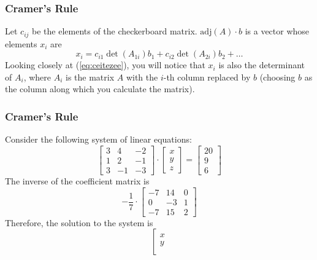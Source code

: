 \documentclass[xcolor=dvipsnames]{beamer}
\begin{document}
\begin{frame}
  \frametitle{Cramer's Rule}
Let $c_{ij}$ be the elements of the checkerboard matrix.
$\mbox{adj}(A)\cdot{}b$ is a vector whose elements $x_{i}$ are
\begin{equation}
  \label{eq:ceitezee}
  x_{i}=c_{i1}\det(A_{1i})b_{1}+c_{i2}\det(A_{2i})b_{2}+{\ldots}
\end{equation}
Looking closely at (\ref{eq:ceitezee}), you will notice that $x_{i}$
is also the determinant of $A_{i}$, where $A_{i}$ is the matrix $A$
with the $i$-th column replaced by $b$ (choosing $b$ as the column
along which you calculate the matrix).
\end{frame}

\begin{frame}
  \frametitle{Cramer's Rule}
  Consider the following system of linear
  equations:
  \begin{equation}
    \label{eq:keiyikae}
    \left[
      \begin{array}{ccc}
        3 & 4 & -2 \\
        1 & 2 & -1 \\
        3 & -1 & -3
      \end{array}\right]\cdot\left[
      \begin{array}{c}
        x \\
        y \\
        z
      \end{array}\right]=\left[
      \begin{array}{c}
        20 \\
        9 \\
        6
      \end{array}\right]
  \end{equation}
  The inverse of the coefficient matrix is
  \begin{equation}
    \label{eq:phiedier}
    -\frac{1}{7}\cdot\left[
      \begin{array}{ccc}
        -7 & 14 & 0 \\
        0 & -3 & 1 \\
        -7 & 15 & 2
      \end{array}\right]
  \end{equation}
  Therefore, the solution to the system is
  \begin{equation}
    \label{eq:suchociw}
    \left[
      \begin{array}{c}
        x \\
        y \\

\end{array}
\end{equation}
\end{frame}
\end{document}
